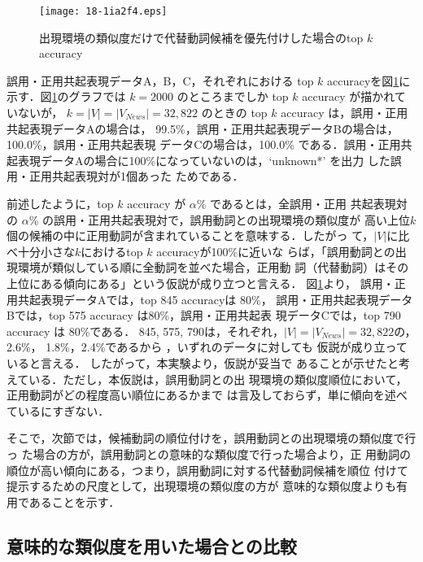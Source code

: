 \documentclass[japanese]{jnlp_1.4}
\begin{document}
\begin{figure}[b]
   \begin{center}
\texttt{[image: 18-1ia2f4.eps]}
   \end{center}
   \caption{出現環境の類似度だけで代替動詞候補を優先付けした場合のtop $k$ accuracy}
   \label{類似度のみtopK}
  \end{figure}

誤用・正用共起表現データA，B，C，それぞれにおける top $k$ accuracyを図\ref{類似度のみtopK}に示す．図\ref{類似度のみtopK}のグラフでは
$k=2000$ のところまでしか top $k$ accuracy が描かれていないが，
$k = |V| = | V_{News} | = 32,822$ のときの
top $k$ accuracy は，誤用・正用共起表現データAの場合は，
  99.5\%，誤用・正用共起表現データBの場合は，100.0\%，誤用・正用共起表現
  データCの場合は，100.0\% である．誤用・正用共起表現データAの場合に100\%になっていないのは，`unknown*' を出力
  した誤用・正用共起表現対が1個あった
  ためである．

前述したように，top $k$ accuracy が $\alpha$\% であるとは，全誤用・正用
共起表現対の $\alpha$\% の誤用・正用共起表現対で，誤用動詞との出現環境の類似度が
高い上位$k$個の候補の中に正用動詞が含まれていることを意味する．したがっ
て，$|V|$に比べ十分小さな$k$におけるtop $k$ accuracyが100\%に近いな
らば，「誤用動詞との出現環境が類似している順に全動詞を並べた場合，正用動
詞（代替動詞）はその上位にある傾向にある」という仮説が成り立つと言える．
図\ref{類似度のみtopK}より，
誤用・正用共起表現データAでは，top 845 accuracyは 80\%，
誤用・正用共起表現データBでは，top 575 accuracy は80\%，誤用・正用共起表
現データCでは，top 790 accuracy は 80\%である．
845, 575, 790は，それぞれ，$|V|=|V_{News}|=32,822$の，2.6\%，
1.8\%，2.4\%であるから
，いずれのデータに対しても
仮説が成り立っていると言える．
したがって，本実験より，仮説が妥当で
あることが示せたと考えている．ただし，本仮説は，誤用動詞との出
現環境の類似度順位において，正用動詞がどの程度高い順位にあるかまで
は言及しておらず，単に傾向を述べているにすぎない．

  そこで，次節では，候補動詞の順位付けを，誤用動詞との出現環境の類似度で行っ
  た場合の方が，誤用動詞との意味的な類似度で行った場合より，正
  用動詞の順位が高い傾向にある，つまり，誤用動詞に対する代替動詞候補を順位
  付けて提示するための尺度として，出現環境の類似度の方が
意味的な類似度よりも有用であることを示す．
  
  
\subsection{意味的な類似度を用いた場合との比較}
\label{シソーラスとの比較}
\end{document}
